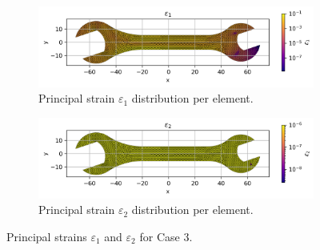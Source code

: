 \begin{figure}[H]
    \centering
    \begin{subfigure}[t]{0.49\textwidth}
        \centering
        \includegraphics[width=\textwidth]{GRAFICOS/Case c - epsilon_1_per_element.png}
        \caption{Principal strain $\varepsilon_1$ distribution per element.}
        \label{fig:epsilon_1_c}
    \end{subfigure}
    \hfill
    \begin{subfigure}[t]{0.49\textwidth}
        \centering
        \includegraphics[width=\textwidth]{GRAFICOS/Case c - epsilon_2_per_element.png}
        \caption{Principal strain $\varepsilon_2$ distribution per element.}
        \label{fig:epsilon_2_c}
    \end{subfigure}
    \caption{Principal strains $\varepsilon_1$ and $\varepsilon_2$ for Case 3.}
    \label{fig:principal_strains_c}
\end{figure}

